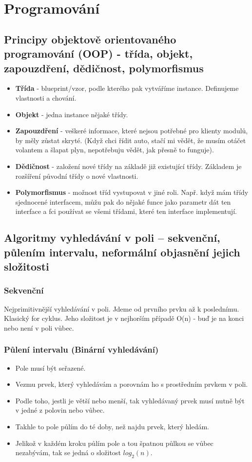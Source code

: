 \documentclass[10pt,a4paper]{article}
\begin{document}
\section{Programování}
\subsection{Principy objektově orientovaného programování (OOP) - třída, objekt, zapouzdření, dědičnost, polymorfismus}

\begin{itemize}
\item \textbf{Třída} - blueprint/vzor, podle kterého pak vytváříme instance. Definujeme vlastnosti a chování.
\item \textbf{Objekt} - jedna instance nějaké třídy.
\item \textbf{Zapouzdření} - veškeré informace, které nejsou potřebné pro klienty modulů, by měly zůstat skryté. (Když chci řídit auto, stačí mi vědět, že musím otáčet volantem a šlapat plyn, nepotřebuju vědět, jak přesně to funguje).
\item \textbf{Dědičnost} - založení nové třídy na základě již existující třídy. Základem je rozšíření původní třídy o nové vlastnosti.
\item \textbf{Polymorfismus} - možnost tříd vystupovat v jiné roli. Např. když mám třídy sjednocené interfacem, můžu pak do nějaké funce jako parametr dát ten interface a fci používat se všemi třídami, které ten interface implementují.
\end{itemize}
\subsection{Algoritmy vyhledávání v poli – sekvenční, půlením intervalu, neformální objasnění jejich složitosti}
\subsubsection{Sekvenční}
Nejprimitivnější vyhledávání v poli. Jdeme od prvního prvku až k poslednímu. Klasický for cyklus. Jeho složitost je v nejhorším případě O(n) - buď je na konci nebo není v poli vůbec.
\subsubsection{Půlení intervalu (Binární vyhledávání)}

\begin{itemize}
\item Pole musí být seřazené.
\item Vezmu prvek, který vyhledávám a porovnám ho s prostředním prvkem v poli.
\item Podle toho, jestli je větší nebo menší, tak vyhledávaný prvek musí nutně být v jedné z polovin nebo vůbec.
\item Takhle to pole půlím do té doby, než najdu prvek, který hledám.
\item Jelikož v každém kroku půlím pole a tou špatnou půlkou se vůbec nezabývám, tak se jedná o složitost $log_2(n)$.
\end{itemize}
\end{document}

